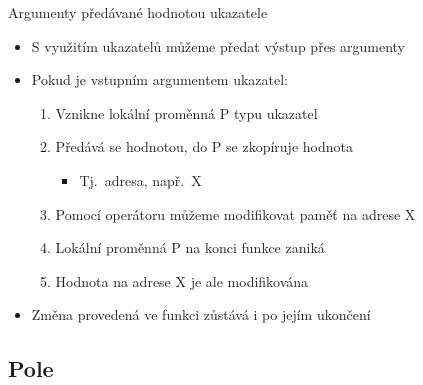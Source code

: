 \begin{frame}{Argumenty předávané hodnotou ukazatele}

  \begin{itemize}
    \item S využitím ukazatelů můžeme předat výstup přes argumenty

    \pause

    \item Pokud je vstupním argumentem ukazatel:
    \begin{enumerate}
      \item Vznikne lokální proměnná P typu ukazatel
      \item Předává se hodnotou, do P se zkopíruje hodnota
      \begin{itemize}
        \item Tj.\ adresa, např.\ X
      \end{itemize}

      \item Pomocí operátoru \code{*} můžeme modifikovat paměť na adrese X
      \item Lokální proměnná P na konci funkce zaniká
      \item Hodnota na adrese X je ale modifikována
    \end{enumerate}

    \pause

    \item Změna provedená ve funkci zůstává i po jejím ukončení
  \end{itemize}

\end{frame}

\subsection*{Pole}
\frame{\subsectionpage}

